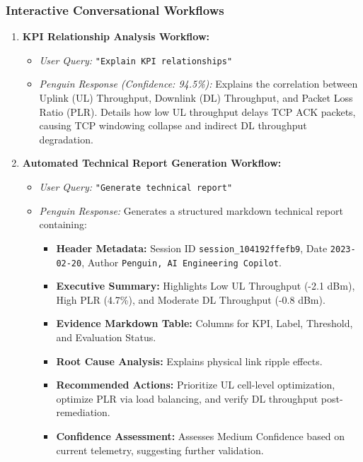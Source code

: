 \documentclass[12pt,a4paper]{article}
\begin{document}
\subsubsection{Interactive Conversational Workflows}
\begin{enumerate}
    \item \textbf{KPI Relationship Analysis Workflow:}
    \begin{itemize}
        \item \textit{User Query:} \texttt{"Explain KPI relationships"}
        \item \textit{Penguin Response (Confidence: 94.5\%):} Explains the correlation between Uplink (UL) Throughput, Downlink (DL) Throughput, and Packet Loss Ratio (PLR). Details how low UL throughput delays TCP ACK packets, causing TCP windowing collapse and indirect DL throughput degradation.
    \end{itemize}
    \item \textbf{Automated Technical Report Generation Workflow:}
    \begin{itemize}
        \item \textit{User Query:} \texttt{"Generate technical report"}
        \item \textit{Penguin Response:} Generates a structured markdown technical report containing:
        \begin{itemize}
            \item \textbf{Header Metadata:} Session ID \texttt{session\_104192ffefb9}, Date \texttt{2023-02-20}, Author \texttt{Penguin, AI Engineering Copilot}.
            \item \textbf{Executive Summary:} Highlights Low UL Throughput (-2.1 dBm), High PLR (4.7\%), and Moderate DL Throughput (-0.8 dBm).
            \item \textbf{Evidence Markdown Table:} Columns for KPI, Label, Threshold, and Evaluation Status.
            \item \textbf{Root Cause Analysis:} Explains physical link ripple effects.
            \item \textbf{Recommended Actions:} Prioritize UL cell-level optimization, optimize PLR via load balancing, and verify DL throughput post-remediation.
            \item \textbf{Confidence Assessment:} Assesses Medium Confidence based on current telemetry, suggesting further validation.
        \end{itemize}
    \end{itemize}
\end{enumerate}
\end{document}
